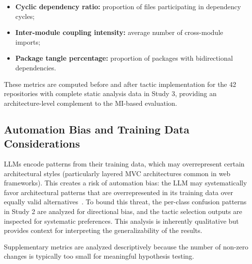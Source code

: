 \begin{itemize}
    \item \textbf{Cyclic dependency ratio:} proportion of files participating in dependency cycles;
    \item \textbf{Inter-module coupling intensity:} average number of cross-module imports;
    \item \textbf{Package tangle percentage:} proportion of packages with bidirectional dependencies.
\end{itemize}

These metrics are computed before and after tactic implementation for the 42 repositories with complete static analysis data in Study 3, providing an architecture-level complement to the MI-based evaluation.

\subsection{Automation Bias and Training Data Considerations}
\label{subsec:met_bias}

LLMs encode patterns from their training data, which may overrepresent certain architectural styles (particularly layered MVC architectures common in web frameworks). This creates a risk of automation bias: the LLM may systematically favor architectural patterns that are overrepresented in its training data over equally valid alternatives~\cite{esposito2025generative}. To bound this threat, the per-class confusion patterns in Study 2 are analyzed for directional bias, and the tactic selection outputs are inspected for systematic preferences. This analysis is inherently qualitative but provides context for interpreting the generalizability of the results.

Supplementary metrics are analyzed descriptively because the number of non-zero changes is typically too small for meaningful hypothesis testing.

